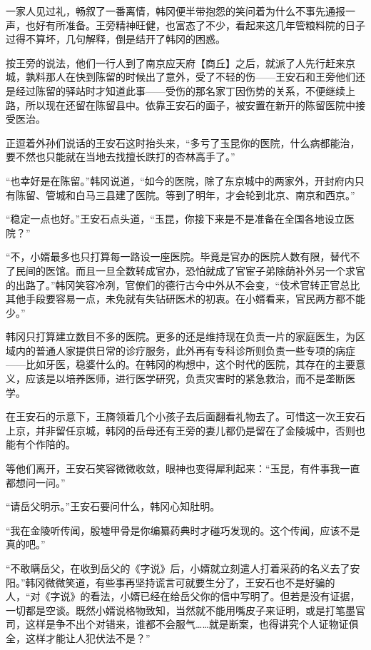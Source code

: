一家人见过礼，畅叙了一番离情，韩冈便半带抱怨的笑问着为什么不事先通报一声，也好有所准备。王旁精神旺健，也富态了不少，看起来这几年管粮料院的日子过得不算坏，几句解释，倒是结开了韩冈的困惑。

按王旁的说法，他们一行人到了南京应天府【商丘】之后，就派了人先行赶来京城，孰料那人在快到陈留的时候出了意外，受了不轻的伤——王安石和王旁他们还是经过陈留的驿站时才知道此事——受伤的那名家丁因伤势的关系，不便继续上路，所以现在还留在陈留县中。依靠王安石的面子，被安置在新开的陈留医院中接受医治。

正逗着外孙们说话的王安石这时抬头来，“多亏了玉昆你的医院，什么病都能治，要不然也只能就在当地去找擅长跌打的杏林高手了。”

“也幸好是在陈留。”韩冈说道，“如今的医院，除了东京城中的两家外，开封府内只有陈留、管城和白马三县建了医院。等到了明年，才会轮到北京、南京和西京。”

“稳定一点也好。”王安石点头道，“玉昆，你接下来是不是准备在全国各地设立医院？”

“不，小婿最多也只打算每一路设一座医院。毕竟是官办的医院人数有限，替代不了民间的医馆。而且一旦全数转成官办，恐怕就成了官宦子弟除荫补外另一个求官的出路了。”韩冈笑容冷冽，官僚们的德行古今中外从不会变，“伎术官转正官总比其他手段要容易一点，未免就有失钻研医术的初衷。在小婿看来，官民两方都不能少。”

韩冈只打算建立数目不多的医院。更多的还是维持现在负责一片的家庭医生，为区域内的普通人家提供日常的诊疗服务，此外再有专科诊所则负责一些专项的病症——比如牙医，稳婆什么的。在韩冈的构想中，这个时代的医院，其存在的主要意义，应该是以培养医师，进行医学研究，负责灾害时的紧急救治，而不是垄断医学。

在王安石的示意下，王旖领着几个小孩子去后面翻看礼物去了。可惜这一次王安石上京，并非留任京城，韩冈的岳母还有王旁的妻儿都仍是留在了金陵城中，否则也能有个作陪的。

等他们离开，王安石笑容微微收敛，眼神也变得犀利起来：“玉昆，有件事我一直都想问一问。”

“请岳父明示。”王安石要问什么，韩冈心知肚明。

“我在金陵听传闻，殷墟甲骨是你编纂药典时才碰巧发现的。这个传闻，应该不是真的吧。”

“不敢瞒岳父，在收到岳父的《字说》后，小婿就立刻遣人打着采药的名义去了安阳。”韩冈微微笑道，有些事再坚持谎言可就要生分了，王安石也不是好骗的人，“对《字说》的看法，小婿已经在给岳父你的信中写明了。但若是没有证据，一切都是空谈。既然小婿说格物致知，当然就不能用嘴皮子来证明，或是打笔墨官司，这样是争不出个对错来，谁都不会服气……就是断案，也得讲究个人证物证俱全，这样才能让人犯伏法不是？”

